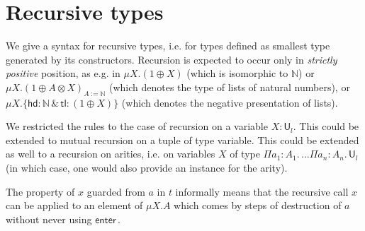 \documentclass{article}
\newcommand{\mkprod}[3]{\Pi {#1}\!:\!{#2}.\,{#3}}
\newcommand{\nat}{\mathbb{N}}
\newcommand{\headname}{\mathsf{hd}}
\newcommand{\tailname}{\mathsf{tl}}
\newcommand{\sort}[1]{\mathsf{U}_{#1}}
\begin{document}
\section{Recursive types}

\newcommand{\inmu}[1]{\mathsf{enter}\,#1}
\newcommand{\appmu}[4]{\mathsf{fix\,}{#1}\,[\mathsf{enter}\,{#3}\,\mapsto\,{#2}]\,\mathsf{in}\,{#1}\,{#4}}

We give a syntax for recursive types, i.e. for types defined as
smallest type generated by its constructors. Recursion is expected to
occur only in {\em strictly positive} position, as e.g. in $\mu X.(1
\oplus X)$ (which is isomorphic to $\nat$) or $\mu X.(1 \oplus A
\otimes X)_{A:=\nat}$ (which denotes the type of lists of natural
numbers), or $\mu X.\{\headname : \nat \,\&\, \tailname : (1 \oplus X)\}$ (which
denotes the negative presentation of lists).

We restricted the rules to the case of recursion on a variable
$X:\sort{l}$. This could be extended to mutual recursion on a tuple of
type variable. This could be extended as well to a recursion on
arities, i.e. on variables $X$ of type
$\mkprod{a_1}{A_1}{...\mkprod{a_n}{A_n}{\sort{l}}}$ (in which case,
one would also provide an instance for the arity).

The property of $x$ guarded from $a$ in $t$ informally means that the
recursive call $x$ can be applied to an element of $\mu X. A$ which
comes by steps of destruction of $a$ without never using $\inmu{}$.
\end{document}
